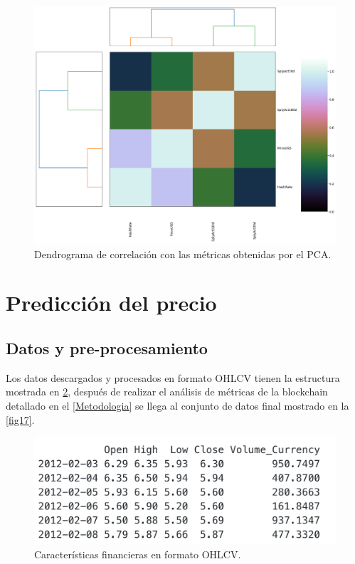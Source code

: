 \begin{figure}
	\centering
	\includegraphics[scale=0.3]{Chapter5/dendo.png}
	\caption{Dendrograma de correlación con las métricas obtenidas por el PCA.}
	\label{fig15}
\end{figure}

\section{Predicción del precio}

\subsection{Datos y pre-procesamiento}
Los datos descargados y procesados en formato OHLCV tienen la estructura mostrada en \cref{fig16}, después de realizar el análisis de métricas de la blockchain detallado en el \cref{Metodologia} se llega al conjunto de datos final mostrado en la \cref{fig17}.

\begin{figure}[h!]
	\centering
	\includegraphics[scale=0.5]{Chapter5/ohlcv.png}
	\caption{Características financieras en formato OHLCV.}
	\label{fig16}
\end{figure}

